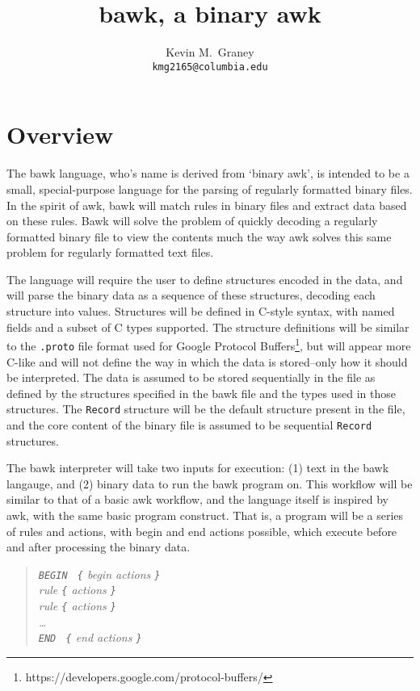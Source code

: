 \documentclass[letterpaper,11pt]{article}
\title{bawk, a binary awk}
\author{
	Kevin M.\ Graney\\
	\texttt{kmg2165@columbia.edu}
}
\begin{document}
\maketitle

\section{Overview}
The bawk language, who's name is derived from `binary awk', is intended to be a small, special-purpose language for the parsing of regularly formatted binary files.  In the spirit of awk, bawk will match rules in binary files and extract data based on these rules.  Bawk will solve the problem of quickly decoding a regularly formatted binary file to view the contents much the way awk solves this same problem for regularly formatted text files.

The language will require the user to define structures encoded in the data, and will parse the binary data as a sequence of these structures, decoding each structure into values.  Structures will be defined in C-style syntax, with named fields and a subset of C types supported.  The structure definitions will be similar to the {\tt .proto} file format used for Google Protocol Buffers\footnote{https://developers.google.com/protocol-buffers/}, but will appear more C-like and will not define the way in which the data is stored--only how it should be interpreted.  The data is assumed to be stored sequentially in the file as defined by the structures specified in the bawk file and the types used in those structures.   The \texttt{Record} structure will be the default structure present in the file, and the core content of the binary file is assumed to be sequential \texttt{Record} structures.

The bawk interpreter will take two inputs for execution: (1) text in the bawk langauge, and (2) binary data to run the bawk program on.  This workflow will be similar to that of a basic awk workflow, and the language itself is inspired by awk, with the same basic program construct.  That is, a program will be a series of rules and actions, with begin and end actions possible, which execute before and after processing the binary data.

\begin{quote}\sl
	{\tt BEGIN } {\tt\{} begin actions {\tt\}}\\
	rule {\tt\{} actions {\tt\}}\\
	rule {\tt\{} actions {\tt\}}\\
	\ldots\\
	{\tt END } {\tt\{} end actions {\tt\}}
\end{quote}
\end{document}

